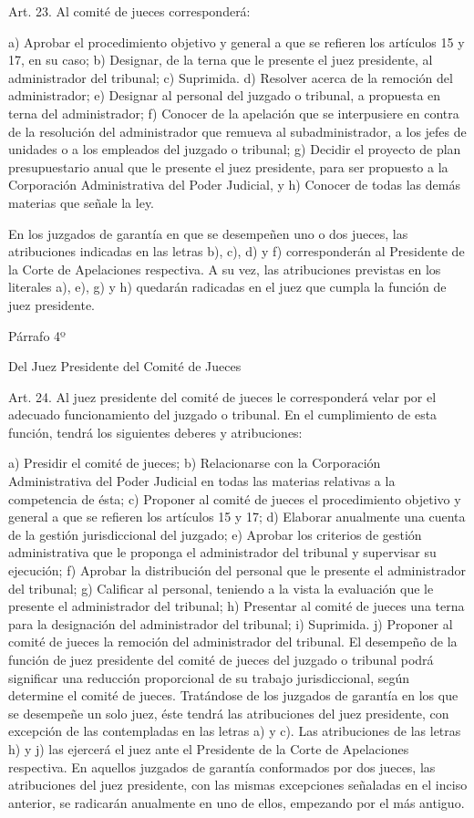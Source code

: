    Art. 23. Al comité de jueces corresponderá:

    a) Aprobar el procedimiento objetivo y general a que se refieren los artículos 15 y 17, en su caso;
    b) Designar, de la terna que le presente el juez presidente, al administrador del tribunal;
    c) Suprimida.
    d) Resolver acerca de la remoción del administrador;
    e) Designar al personal del juzgado o tribunal, a propuesta en terna del administrador;
    f) Conocer de la apelación que se interpusiere en contra de la resolución del administrador que remueva al subadministrador, a los jefes de unidades o a los empleados del juzgado o tribunal;
    g) Decidir el proyecto de plan presupuestario anual que le presente el juez presidente, para ser propuesto a la Corporación Administrativa del Poder Judicial, y
    h) Conocer de todas las demás materias que señale la ley.

    En los juzgados de garantía en que se desempeñen uno o dos jueces, las atribuciones indicadas en las letras b), c), d) y f) corresponderán al Presidente de la Corte de Apelaciones respectiva. A su vez, las atribuciones previstas en los literales a), e), g) y h) quedarán radicadas en el juez que cumpla la función de juez presidente.

    Párrafo 4º

    Del Juez Presidente del Comité de Jueces

    Art. 24. Al juez presidente del comité de jueces le corresponderá velar por el adecuado funcionamiento del juzgado o tribunal.
    En el cumplimiento de esta función, tendrá los siguientes deberes y atribuciones:

    a) Presidir el comité de jueces;
    b) Relacionarse con la Corporación Administrativa del Poder Judicial en todas las materias relativas a la competencia de ésta;
    c) Proponer al comité de jueces el procedimiento objetivo y general a que se refieren los artículos 15 y 17;
    d) Elaborar anualmente una cuenta de la gestión jurisdiccional del juzgado;
    e) Aprobar los criterios de gestión administrativa que le proponga el administrador del tribunal y supervisar su ejecución;
    f) Aprobar la distribución del personal que le presente el administrador del tribunal;
    g) Calificar al personal, teniendo a la vista la evaluación que le presente el administrador del tribunal;
    h) Presentar al comité de jueces una terna para la designación del administrador del tribunal;
    i) Suprimida.
    j) Proponer al comité de jueces la remoción del administrador del tribunal.
    El desempeño de la función de juez presidente del comité de jueces del juzgado o tribunal podrá significar una reducción proporcional de su trabajo jurisdiccional, según determine el comité de jueces.
    Tratándose de los juzgados de garantía en los que se desempeñe un solo juez, éste tendrá las atribuciones del juez presidente, con excepción de las contempladas en las letras a) y c). Las atribuciones de las letras h) y j) las ejercerá el juez ante el Presidente de la Corte de Apelaciones respectiva.
    En aquellos juzgados de garantía conformados por dos jueces, las atribuciones del juez presidente, con las mismas excepciones señaladas en el inciso anterior, se radicarán anualmente en uno de ellos, empezando por el más antiguo.

